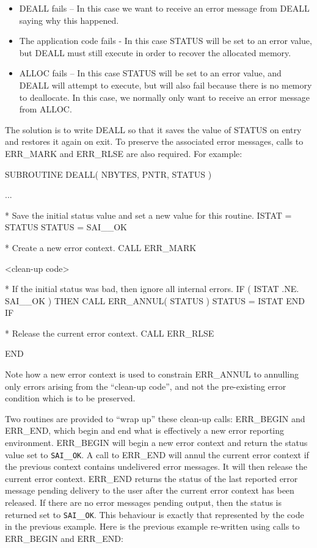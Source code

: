 \documentclass[twoside,11pt]{starlink}
\providecommand{\const}[1]{\texttt{#1}}
\providecommand{\saiok}{\const{SAI\_\_OK}}
\begin{document}
\begin{itemize}
\item DEALL fails -- In this case we want to receive an error message from
DEALL saying why this happened.

\item The application code fails - In this case STATUS will be set to an
error value, but DEALL must still execute in order to recover the allocated
memory.

\item ALLOC fails -- In this case STATUS will be set to an error value, and
DEALL will attempt to execute, but will also fail because there is no memory
to deallocate.
In this case, we normally only want to receive an error message from ALLOC.
\end {itemize}

The solution is to write DEALL so that it saves the value of STATUS on entry
and restores it again on exit.
To preserve the associated error messages, calls to ERR\_MARK and ERR\_RLSE
are also required.
For example:


\begin {small}
\begin{terminalv}
      SUBROUTINE DEALL( NBYTES, PNTR, STATUS )

      ...

*  Save the initial status value and set a new value for this routine.
      ISTAT = STATUS
      STATUS = SAI__OK

*  Create a new error context.
      CALL ERR_MARK

      <clean-up code>

*  If the initial status was bad, then ignore all internal errors.
      IF ( ISTAT .NE. SAI__OK ) THEN
         CALL ERR_ANNUL( STATUS )
         STATUS = ISTAT
      END IF

*  Release the current error context.
      CALL ERR_RLSE

      END
\end{terminalv}
\end {small}

Note how a new error context is used to constrain ERR\_ANNUL to annulling
only errors arising from the ``clean-up code'', and not the pre-existing
error condition which is to be preserved.

Two routines are provided to ``wrap up'' these clean-up calls: ERR\_BEGIN and
ERR\_END, which begin and end what is effectively a new error reporting
environment.
ERR\_BEGIN will begin a new error context and return the
status value set to \saiok.
A call to ERR\_END will annul the current error context if the previous
context contains undelivered error messages.
It will then release the current error context.
ERR\_END returns the status of the last reported error message pending
delivery to the user after the current error context has been released.
If there are no error messages pending output, then the status is
returned set to \saiok.
This behaviour is exactly that represented by the code in the previous example.
Here is the previous example re-written using calls to ERR\_BEGIN and
ERR\_END:
\end{document}
